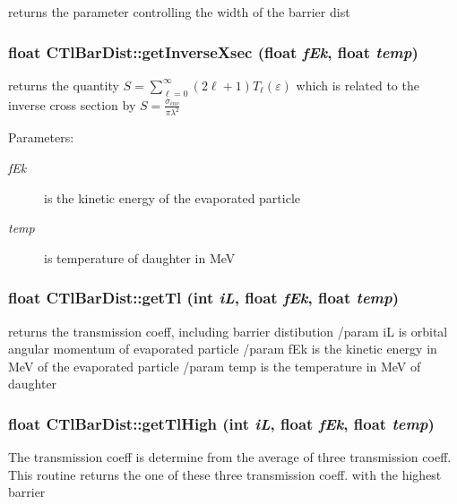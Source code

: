 returns the parameter controlling the width of the barrier dist 
\subsubsection{\setlength{\rightskip}{0pt plus 5cm}float CTl\-Bar\-Dist::get\-Inverse\-Xsec (float {\em f\-Ek}, float {\em temp})}\label{classCTlBarDist_913e52ffd909bca82ef6c5e0f4e9a271}


returns the quantity $S=\sum_{\ell=0}^{\infty} (2\ell+1)T_{\ell}(\varepsilon)$ which is related to the inverse cross section by $S=\frac{\sigma_{inv}}{\pi\lambda^{2}}$ \begin{Desc}
\item[Parameters:]
\begin{description}
\item[{\em f\-Ek}]is the kinetic energy of the evaporated particle \item[{\em temp}]is temperature of daughter in Me\-V \end{description}
\end{Desc}
\subsubsection{\setlength{\rightskip}{0pt plus 5cm}float CTl\-Bar\-Dist::get\-Tl (int {\em i\-L}, float {\em f\-Ek}, float {\em temp})}\label{classCTlBarDist_d797206db604d037e74be189a14c7325}


returns the transmission coeff, including barrier distibution /param i\-L is orbital angular momentum of evaporated particle /param f\-Ek is the kinetic energy in Me\-V of the evaporated particle /param temp is the temperature in Me\-V of daughter 
\subsubsection{\setlength{\rightskip}{0pt plus 5cm}float CTl\-Bar\-Dist::get\-Tl\-High (int {\em i\-L}, float {\em f\-Ek}, float {\em temp})}\label{classCTlBarDist_19c7c281fd6145952e4a8413faf32eec}


The transmission coeff is determine from the average of three transmission coeff. This routine returns the one of these three transmission coeff. with the highest barrier

